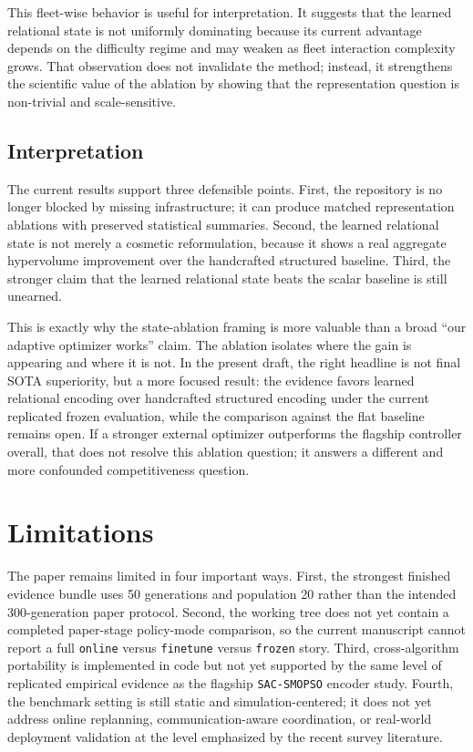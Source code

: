 \documentclass[a4paper,fleqn]{cas-dc}
\begin{document}
This fleet-wise behavior is useful for interpretation. It suggests that the learned relational state is not uniformly dominating because its current advantage depends on the difficulty regime and may weaken as fleet interaction complexity grows. That observation does not invalidate the method; instead, it strengthens the scientific value of the ablation by showing that the representation question is non-trivial and scale-sensitive.

\subsection{Interpretation}

The current results support three defensible points. First, the repository is no longer blocked by missing infrastructure; it can produce matched representation ablations with preserved statistical summaries. Second, the learned relational state is not merely a cosmetic reformulation, because it shows a real aggregate hypervolume improvement over the handcrafted structured baseline. Third, the stronger claim that the learned relational state beats the scalar baseline is still unearned.

This is exactly why the state-ablation framing is more valuable than a broad ``our adaptive optimizer works'' claim. The ablation isolates where the gain is appearing and where it is not. In the present draft, the right headline is not final SOTA superiority, but a more focused result: the evidence favors learned relational encoding over handcrafted structured encoding under the current replicated frozen evaluation, while the comparison against the flat baseline remains open. If a stronger external optimizer outperforms the flagship controller overall, that does not resolve this ablation question; it answers a different and more confounded competitiveness question.

\section{Limitations}

The paper remains limited in four important ways. First, the strongest finished evidence bundle uses 50 generations and population 20 rather than the intended 300-generation paper protocol. Second, the working tree does not yet contain a completed paper-stage policy-mode comparison, so the current manuscript cannot report a full \texttt{online} versus \texttt{finetune} versus \texttt{frozen} story. Third, cross-algorithm portability is implemented in code but not yet supported by the same level of replicated empirical evidence as the flagship \texttt{SAC-SMOPSO} encoder study. Fourth, the benchmark setting is still static and simulation-centered; it does not yet address online replanning, communication-aware coordination, or real-world deployment validation at the level emphasized by the recent survey literature.
\end{document}
